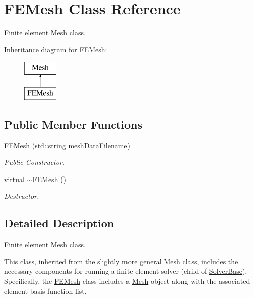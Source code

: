 \hypertarget{class_f_e_mesh}{}\section{F\+E\+Mesh Class Reference}
\label{class_f_e_mesh}


Finite element \mbox{\hyperlink{class_mesh}{Mesh}} class.  


Inheritance diagram for F\+E\+Mesh\+:\begin{figure}[H]
\begin{center}
\leavevmode
\includegraphics[height=2.000000cm]{class_f_e_mesh}
\end{center}
\end{figure}
\subsection*{Public Member Functions}
\begin{DoxyCompactItemize}
\item 
\mbox{\hyperlink{class_f_e_mesh_a3d79a6cd8810a53661cea79ed1fbe922}{F\+E\+Mesh}} (std\+::string mesh\+Data\+Filename)
\begin{DoxyCompactList}\small\item\em Public Constructor. \end{DoxyCompactList}\item 
virtual \mbox{\hyperlink{class_f_e_mesh_af4ea40d79e331fb1646da1f5766e22eb}{$\sim$\+F\+E\+Mesh}} ()
\begin{DoxyCompactList}\small\item\em Destructor. \end{DoxyCompactList}\end{DoxyCompactItemize}


\subsection{Detailed Description}
Finite element \mbox{\hyperlink{class_mesh}{Mesh}} class. 

This class, inherited from the slightly more general \mbox{\hyperlink{class_mesh}{Mesh}} class, includes the necessary components for running a finite element solver (child of \mbox{\hyperlink{class_solver_base}{Solver\+Base}}). Specifically, the \mbox{\hyperlink{class_f_e_mesh}{F\+E\+Mesh}} class includes a \mbox{\hyperlink{class_mesh}{Mesh}} object along with the associated element basis function list. 

